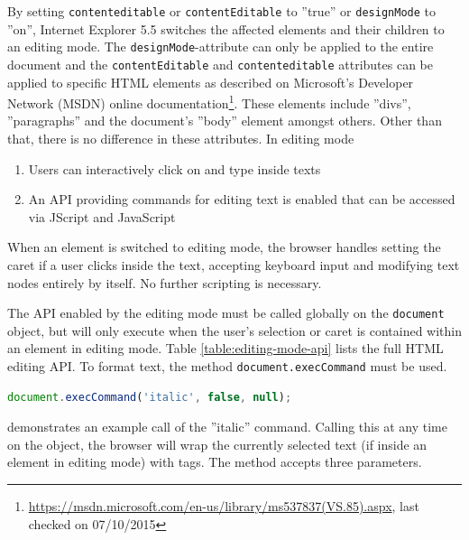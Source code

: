 By setting \texttt{contenteditable} or \texttt{contentEditable} to ''true'' or \texttt{designMode} to ''on'', Internet Explorer 5.5 switches the affected elements and their children to an editing mode. The \texttt{designMode}-attribute can only be applied to the entire document and the \texttt{contentEditable} and \texttt{contenteditable} attributes can be applied to specific HTML elements as described on Microsoft's Developer Network (MSDN) online documentation\footnote{\url{https://msdn.microsoft.com/en-us/library/ms537837(VS.85).aspx}, last checked on 07/10/2015}. These elements include ''divs'', ''paragraphs'' and the document's ''body'' element amongst others. Other than that, there is no difference in these attributes. In editing mode

\begin{enumerate}
\item Users can interactively click on and type inside texts
\item An API providing commands for editing text is enabled that can be accessed via JScript and JavaScript
\end{enumerate}

When an element is switched to editing mode, the browser handles setting the caret if a user clicks inside the text, accepting keyboard input and modifying text nodes entirely by itself. No further scripting is necessary.

The API enabled by the editing mode must be called globally on the \texttt{document} object, but will only execute when the user's selection or caret is contained within an element in editing mode. Table \ref{table:editing-mode-api} lists the full HTML editing API. To format text, the method \texttt{document.execCommand} must be used.

\begin{lstlisting}[language=JavaScript, caption=Emphasizing text using the HTML editing API, label=lst:execcommand-italics]
document.execCommand('italic', false, null);
\end{lstlisting}

 demonstrates an example call of the ''italic'' command. Calling this at any time on the  object, the browser will wrap the currently selected text (if inside an element in editing mode) with  tags. The method accepts three parameters.

